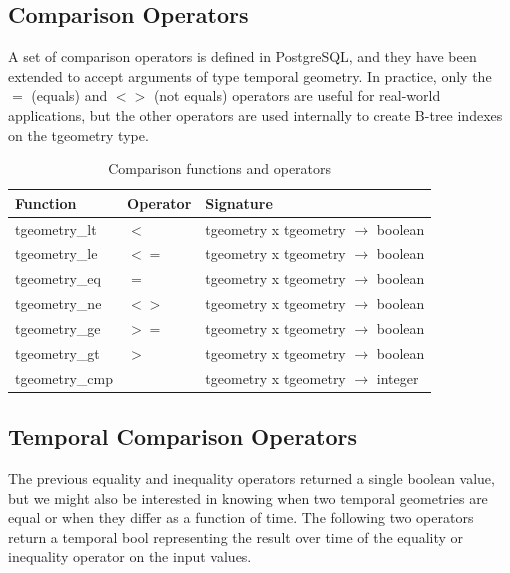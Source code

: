 \subsection{Comparison Operators}
\label{section:comparison_funcs}

A set of comparison operators is defined in PostgreSQL, and they have been extended to accept arguments of type temporal geometry. In practice, only the $=$ (equals) and $<>$ (not equals) operators are useful for real-world applications, but the other operators are used internally to create B-tree indexes on the tgeometry type.

\begin{table}[h!]
    \centering
    \begin{tabularx}{\textwidth}{|l|l|X|}
    \hline
    \textbf{Function}   & \textbf{Operator} & \textbf{Signature} \\
    \hline
    tgeometry\_lt    & $<$   & tgeometry x tgeometry $\rightarrow$ boolean \\
    \hline
    tgeometry\_le    & $<=$   & tgeometry x tgeometry $\rightarrow$ boolean \\
    \hline
    tgeometry\_eq    & $=$   & tgeometry x tgeometry $\rightarrow$ boolean \\
    \hline
    tgeometry\_ne    & $<>$   & tgeometry x tgeometry $\rightarrow$ boolean \\
    \hline
    tgeometry\_ge    & $>=$   & tgeometry x tgeometry $\rightarrow$ boolean \\
    \hline
    tgeometry\_gt    & $>$   & tgeometry x tgeometry $\rightarrow$ boolean \\
    \hline
    tgeometry\_cmp    & & tgeometry x tgeometry $\rightarrow$ integer \\
    \hline
    \end{tabularx}
    \caption{Comparison functions and operators}
    \label{table:comparison_funcs}
\end{table}

\subsection{Temporal Comparison Operators}
\label{section:temporal_comparison}

The previous equality and inequality operators returned a single boolean value, but we might also be interested in knowing when two temporal geometries are equal or when they differ as a function of time. The following two operators return a temporal bool representing the result over time of the equality or inequality operator on the input values.

